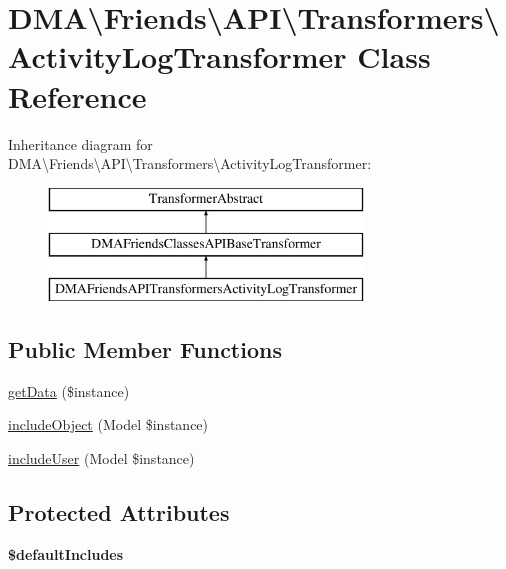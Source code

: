 \hypertarget{classDMA_1_1Friends_1_1API_1_1Transformers_1_1ActivityLogTransformer}{}\section{D\+M\+A\textbackslash{}Friends\textbackslash{}A\+P\+I\textbackslash{}Transformers\textbackslash{}Activity\+Log\+Transformer Class Reference}
\label{classDMA_1_1Friends_1_1API_1_1Transformers_1_1ActivityLogTransformer}
Inheritance diagram for D\+M\+A\textbackslash{}Friends\textbackslash{}A\+P\+I\textbackslash{}Transformers\textbackslash{}Activity\+Log\+Transformer\+:\begin{figure}[H]
\begin{center}
\leavevmode
\includegraphics[height=3.000000cm]{dd/dbd/classDMA_1_1Friends_1_1API_1_1Transformers_1_1ActivityLogTransformer}
\end{center}
\end{figure}
\subsection*{Public Member Functions}
\begin{DoxyCompactItemize}
\item 
\hyperlink{classDMA_1_1Friends_1_1API_1_1Transformers_1_1ActivityLogTransformer_ac409b7881bcd7d479b2876ea5fbaa6ed}{get\+Data} (\$instance)
\item 
\hyperlink{classDMA_1_1Friends_1_1API_1_1Transformers_1_1ActivityLogTransformer_a700ebac47dfef9c1327212c904b7bdd4}{include\+Object} (Model \$instance)
\item 
\hyperlink{classDMA_1_1Friends_1_1API_1_1Transformers_1_1ActivityLogTransformer_abe5575182af5af066506991b5e2ab693}{include\+User} (Model \$instance)
\end{DoxyCompactItemize}
\subsection*{Protected Attributes}
\begin{DoxyCompactItemize}
\item 
{\bfseries \$default\+Includes}
\end{DoxyCompactItemize}
